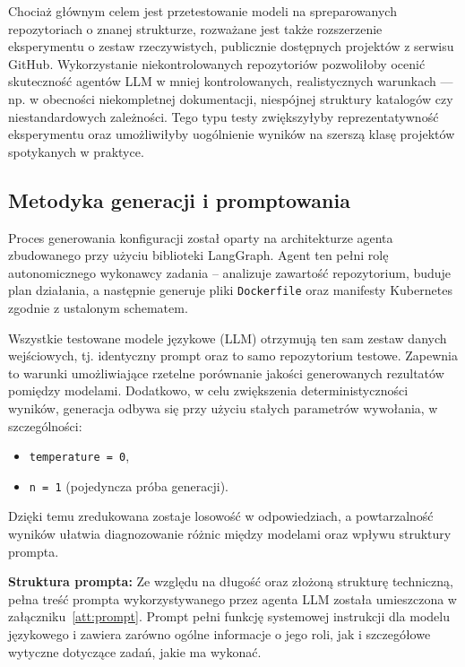 Chociaż głównym celem jest przetestowanie modeli na spreparowanych repozytoriach o znanej strukturze, rozważane jest także rozszerzenie eksperymentu o zestaw rzeczywistych, publicznie dostępnych projektów z serwisu GitHub. Wykorzystanie niekontrolowanych repozytoriów pozwoliłoby ocenić skuteczność agentów LLM w mniej kontrolowanych, realistycznych warunkach — np. w obecności niekompletnej dokumentacji, niespójnej struktury katalogów czy niestandardowych zależności. Tego typu testy zwiększyłyby reprezentatywność eksperymentu oraz umożliwiłyby uogólnienie wyników na szerszą klasę projektów spotykanych w praktyce.

\subsection{Metodyka generacji i promptowania}

Proces generowania konfiguracji został oparty na architekturze agenta zbudowanego przy użyciu biblioteki LangGraph. Agent ten pełni rolę autonomicznego wykonawcy zadania – analizuje zawartość repozytorium, buduje plan działania, a następnie generuje pliki \texttt{Dockerfile} oraz manifesty Kubernetes zgodnie z ustalonym schematem.

Wszystkie testowane modele językowe (LLM) otrzymują ten sam zestaw danych wejściowych, tj. identyczny prompt oraz to samo repozytorium testowe. Zapewnia to warunki umożliwiające rzetelne porównanie jakości generowanych rezultatów pomiędzy modelami. Dodatkowo, w celu zwiększenia deterministyczności wyników, generacja odbywa się przy użyciu stałych parametrów wywołania, w szczególności:
\begin{itemize}
    \item \texttt{temperature = 0},
    \item \texttt{n = 1} (pojedyncza próba generacji).
\end{itemize}

Dzięki temu zredukowana zostaje losowość w odpowiedziach, a powtarzalność wyników ułatwia diagnozowanie różnic między modelami oraz wpływu struktury prompta.

\bigskip
\noindent
\textbf{Struktura prompta:}  
Ze względu na długość oraz złożoną strukturę techniczną, pełna treść prompta wykorzystywanego przez agenta LLM została umieszczona w załączniku~\ref{att:prompt}. Prompt pełni funkcję systemowej instrukcji dla modelu językowego i zawiera zarówno ogólne informacje o jego roli, jak i szczegółowe wytyczne dotyczące zadań, jakie ma wykonać.

